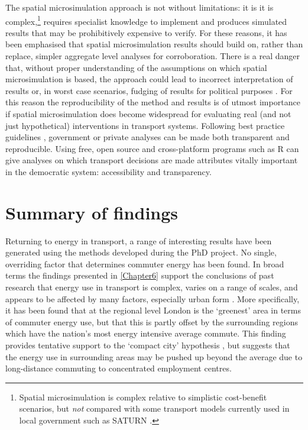 The spatial microsimulation approach is not without limitations: it is
it is complex,\footnote{Spatial
microsimulation is complex relative to
simplistic cost-benefit scenarios, but \emph{not}
compared with some transport models currently used in local government such as
SATURN \citep{SATURN2012}.
}
requires specialist knowledge to implement and produces simulated results that
may be prohibitively expensive to verify. For these reasons, it has been
emphasised that spatial microsimulation results should build on, rather than
replace, simpler aggregate level analyses for corroboration. There is a real
danger that, without proper understanding of the assumptions on which spatial
microsimulation is based, the approach could lead to incorrect interpretation
of results or, in worst case scenarios, fudging of results for political
purposes \citep{Openshaw1978}.
For this reason the reproducibility of the method and results is of utmost
importance if spatial microsimulation does
become widespread for evaluating real (and not just hypothetical)
interventions in transport systems. Following best practice guidelines
\citep{Peng2006}, government or private analyses can be made both transparent
and reproducible. Using free, open source and cross-platform programs such as R
can give analyses on which transport decisions are made attributes
vitally important in the democratic system: accessibility and transparency.

\section{Summary of findings} \label{sumfind}
Returning to energy in transport, a range of interesting results have been
generated using the methods developed during the PhD project.
No single,
overriding factor that determines commuter energy has been found. In broad
terms the findings presented in \cref{Chapter6}
support the conclusions of past research that energy use in transport is
complex, varies on a range of scales, and appears to be affected by many
factors, especially urban form \citep{Levtnson1997, smith2011polycentricity,
Levinson2012}.
More specifically, it has been found that at the regional level London
is the `greenest' area in terms of commuter energy use, but that this is
partly offset by the surrounding regions which have the nation's most
energy intensive average commute. This finding provides tentative support
to the `compact city' hypothesis \citep{Breheny1995}, but suggests that
the energy use in surrounding areas may be pushed up beyond the average
due to long-distance commuting to concentrated employment centres.

